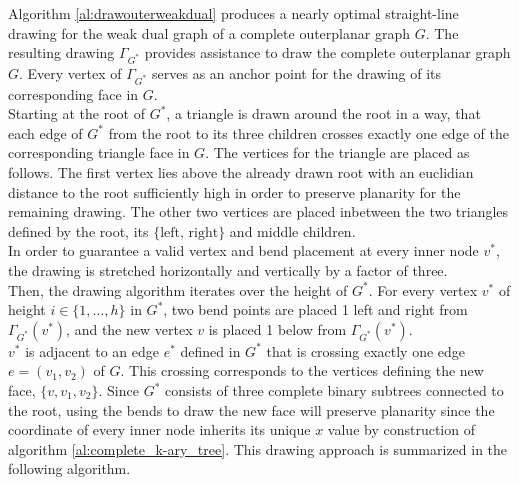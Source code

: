 Algorithm \ref{al:drawouterweakdual} produces a nearly optimal straight-line drawing for the weak dual graph of a complete outerplanar graph $G$. The resulting drawing $\Gamma_{G^*}$ provides assistance to draw the complete outerplanar graph $G$. Every vertex of $\Gamma_{G^*}$ serves as an anchor point for the drawing of its corresponding face in $G$.\\
Starting at the root of $G^*$, a triangle is drawn around the root in a way, that each edge of $G^*$ from the root to its three children crosses exactly one edge of the corresponding triangle face in $G$. The vertices for the triangle are placed as follows. The first vertex lies above the already drawn root with an euclidian distance to the root sufficiently high in order to preserve planarity for the remaining drawing. The other two vertices are placed inbetween the two triangles defined by the root, its $\{\text{left, right}\}$ and middle children.\\
In order to guarantee a valid vertex and bend placement at every inner node $v^*$, the drawing is stretched horizontally and vertically by a factor of three.\\
Then, the drawing algorithm iterates over the height of $G^*$. For every vertex $v^*$ of height $i\in \{1,...,h\}$ in $G^*$, two bend points are placed 1 \UL left and right from $\Gamma_{G^*}(v^*)$, and the new vertex $v$ is placed 1 \UL below from $\Gamma_{G^*}(v^*)$.\\
$v^*$ is adjacent to an edge $e^*$ defined in $G^*$ that is crossing exactly one edge $e = (v_1,v_2)$ of $G$. This crossing corresponds to the vertices defining the new face, $\{v, v_1, v_2\}$. Since $G^*$ consists of three complete binary subtrees connected to the root, using the bends to draw the new face will preserve planarity since the coordinate of every inner node inherits its unique $x$ value by construction of algorithm \ref{al:complete_k-ary_tree}.
This drawing approach is summarized in the following algorithm.\\
